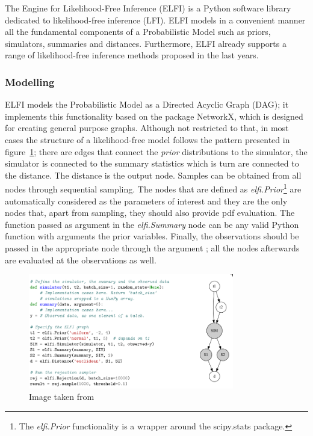 The Engine for Likelihood-Free Inference (ELFI) \cite{1708.00707} is a
Python software library dedicated to likelihood-free inference
(LFI). ELFI models in a convenient manner all the fundamental
components of a Probabilistic Model such as priors, simulators,
summaries and distances. Furthermore, ELFI already supports a range of
likelihood-free inference methods proposed in the last years.

\subsubsection{Modelling}
\label{sec:modelling}

ELFI models the Probabilistic Model as a Directed Acyclic Graph (DAG);
it implements this functionality based on the package NetworkX, which
is designed for creating general purpose graphs. Although not
restricted to that, in most cases the structure of a likelihood-free
model follows the pattern presented in figure~\ref{fig:elfi-model};
there are edges that connect the \textit{prior} distributions to the
simulator, the simulator is connected to the summary statistics which
is turn are connected to the distance. The distance is the output
node. Samples can be obtained from all nodes through sequential
sampling. The nodes that are defined as
\textit{elfi.Prior}\footnote{The \textit{elfi.Prior} functionality is
  a wrapper around the scipy.stats package.} are automatically
considered as the parameters of interest and they are the only nodes
that, apart from sampling, they should also provide pdf
evaluation. The function passed as argument in the
\textit{elfi.Summary} node can be any valid Python function with
arguments the prior variables. Finally, the observations should be
passed in the appropriate node through the argument
; all the nodes afterwards are evaluated at the
observations as well.

\begin{figure}[!ht]
    \begin{center}
      \includegraphics[width=0.8\textwidth]{./Thesis/images/chapter2/elfi.png}
    \end{center}
    \caption{Image taken from \cite{1708.00707}}
    \label{fig:elfi-model}
\end{figure}


